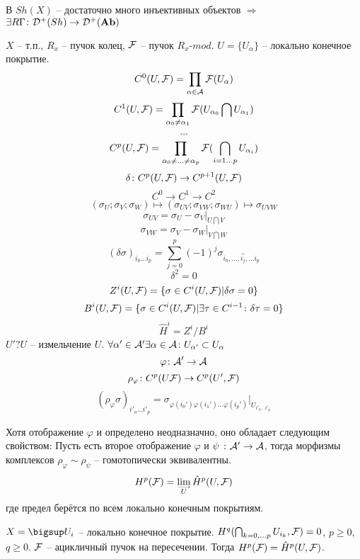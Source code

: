\documentclass[../main.tex]{subfiles}
\begin{document}
\begin{to_com}
В $Sh(X)$ -- достаточно много инъективных объектов $\Rightarrow$ $\exists R \Gamma \colon \mathcal{D}^+(Sh) \to \mathcal{D}^+(\mathbf{Ab})$
\end{to_com}
\begin{to_def}
$X$ -- т.п., $R_x$ -- пучок колец, $\mathcal{F}$ -- пучок $R_x$-$mod$. $U = \lbrace U_{\alpha}\rbrace$ -- локально конечное покрытие.
\[C^0(U, \mathcal{F}) = \prod_{\alpha\in \mathcal{A}}\mathcal{F}(U_{\alpha})\]
\[C^1(U, \mathcal{F}) = \prod_{\alpha_0 \neq \alpha_1 }\mathcal{F}(U_{\alpha_0}\bigcap U_{\alpha_1})\]
\[\ldots\]
\[C^p(U, \mathcal{F}) = \prod_{\alpha_0 \neq \ldots \neq \alpha_p}\mathcal{F}(\bigcap_{i = 1\ldots p}U_{\alpha_i})\]
\[\delta\colon C^p(U, \mathcal{F}) \to C^{p+1}(U, \mathcal{F})\]
\[C^0 \to C^1 \to C^2\]
\[(\sigma_U; \sigma_V; \sigma_W) \mapsto (\sigma_{UV};\sigma_{VW};\sigma_{WU}) \mapsto \sigma_{UVW} \]
\[\sigma_{UV} = \sigma_U - \sigma_V\vert_{U\bigcap V}\]
\[\sigma_{VW} = \sigma_V - \sigma_W\vert_{V\bigcap W}\]
\[(\delta \sigma)_{i_0\ldots i_{p}} = \sum_{j=0}^{p}(-1)^j\sigma_{i_0, \ldots, \hat{i_j}, \ldots i_{p}}\]
\[\delta^2 = 0\]
\[Z^i (U, \mathcal{F})= \lbrace \sigma \in C^i(U, \mathcal{F})\vert \delta\sigma = 0\rbrace\]
\[B^i (U, \mathcal{F})= \lbrace \sigma \in C^i(U, \mathcal{F})\vert \exists \tau \in C^{i-1} \colon \delta \tau = 0 \rbrace\]
\[\hat{H}^i = Z^i / B^i\]
$U' ? U$ -- измельчение $U$. $\forall \alpha'\in \mathcal{A}' \exists \alpha\in \mathcal{A} \colon U_{\alpha'}\subset U_{\alpha}$
\[\varphi \colon \mathcal{A}' \to \mathcal{A}\]
\[\rho_{\varphi}\colon C^p (U \mathcal{F}) \to C^p(U', \mathcal{F})\]
\[(\rho_{\varphi}\sigma)_{i'_o\ldots i'_p} = \sigma_{\varphi(i_0')\varphi(i_1')\ldots\varphi(i_p')}\vert_{U_{i'_0\ldots i'_p}}\]
\end{to_def}
Хотя отображение $\varphi$ и определено неодназначно, оно обладает следующим свойством: Пусть есть второе отображение $\varphi$ и $\psi$ $\colon \mathcal{A}' \to \mathcal{A}$, тогда морфизмы комплексов $\rho_\varphi\sim \rho_{\psi}$ -- гомотопически эквивалентны.
\[H^p(\F) = \varinjlim_{U}\hat{H}^p(U, \F)\]
где предел берётся по всем локально конечным покрытиям.
\begin{to_thr}
$X = \bigsup U_i$ -- локально конечное покрытие. $H^q (\bigcap_{k = 0, \ldots p}U_{i_k}, \mathcal{F}) = 0$, $p\ge 0$, $q\ge 0$. $\mathcal{F}$ -- ацикличный пучок на пересечении. Тогда $H^p(\mathcal{F}) = \hat{H}^p(U, \mathcal{F})$.
\end{to_thr}
\end{document}
